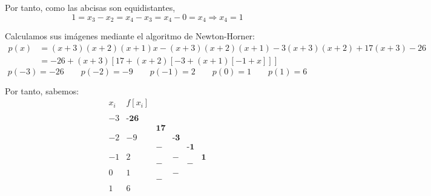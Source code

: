 \begin{ejercicio}
\begin{enumerate}
        Por tanto, como las abcisas son equidistantes,
        \begin{equation*}
            1 = x_3-x_2 = x_4-x_3 = x_4-0 = x_4 \Longrightarrow x_4 = 1
        \end{equation*}

        Calculamos sus imágenes mediante el algoritmo de Newton-Horner:
        \begin{equation*}
            \begin{split}
                p(x)& = (x + 3)(x + 2)(x + 1)x - (x + 3)(x + 2)(x + 1) - 3(x + 3)(x + 2) + 17(x + 3) - 26\\
                &= -26 +(x+3)[17 + (x+2)[-3 + (x+1)[-1 + x]]]
            \end{split}
        \end{equation*}
        \begin{equation*}
            p(-3) = -26 \qquad p(-2) = -9 \qquad p(-1) =  2 \qquad p(0) = 1 \qquad p(1) = 6
        \end{equation*}

        Por tanto, sabemos:
        \begin{equation*}
            \begin{array}{c|cccccc}
                x_i & f[x_i] \\
                \\
                -3 & \textbf{-26} \\
                && \textbf{17}\\
                -2 & -9 && \textbf{-3}\\
                && -&&\textbf{-1}\\
                -1 & 2 && - && \textbf{1}\\
                && - && -\\
                0 & 1 && -\\
                && -\\
                1 & 6\\
            \end{array}
        \end{equation*}
        

\end{enumerate}
\end{ejercicio}
